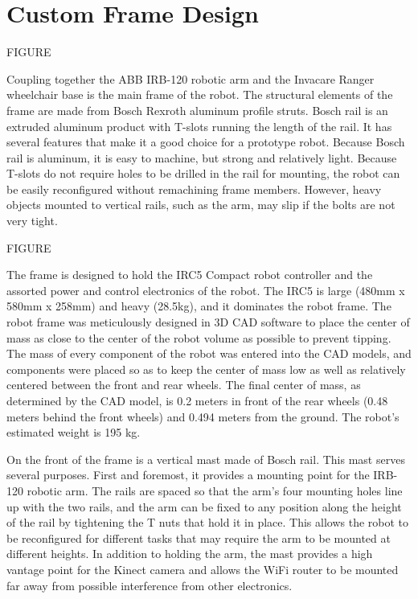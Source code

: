 \documentclass[]{cwru} %
\begin{document}
\chapter{Custom Frame Design}

FIGURE

Coupling together the ABB IRB-120 robotic arm and the Invacare Ranger
wheelchair base is the main frame of the robot. The structural elements
of the frame are made from Bosch Rexroth aluminum profile struts. Bosch
rail is an extruded aluminum product with T-slots running the length of
the rail. It has several features that make it a good choice for a
prototype robot. Because Bosch rail is aluminum, it is easy to machine,
but strong and relatively light. Because T-slots do not require holes to
be drilled in the rail for mounting, the robot can be easily
reconfigured without remachining frame members. However, heavy objects
mounted to vertical rails, such as the arm, may slip if the bolts are
not very tight.

FIGURE

The frame is designed to hold the IRC5 Compact robot controller and the
assorted power and control electronics of the robot. The IRC5 is large
(480mm x 580mm x 258mm) and heavy (28.5kg), and it dominates the robot
frame. The robot frame was meticulously designed in 3D CAD software to
place the center of mass as close to the center of the robot volume as
possible to prevent tipping. The mass of every component of the robot
was entered into the CAD models, and components were placed so as to
keep the center of mass low as well as relatively centered between the
front and rear wheels. The final center of mass, as determined by the
CAD model, is 0.2 meters in front of the rear wheels (0.48 meters behind
the front wheels) and 0.494 meters from the ground. The robot's
estimated weight is 195 kg.

On the front of the frame is a vertical mast made of Bosch rail. This
mast serves several purposes. First and foremost, it provides a mounting
point for the IRB-120 robotic arm. The rails are spaced so that the
arm's four mounting holes line up with the two rails, and the arm can be
fixed to any position along the height of the rail by tightening the T
nuts that hold it in place. This allows the robot to be reconfigured for
different tasks that may require the arm to be mounted at different
heights. In addition to holding the arm, the mast provides a high
vantage point for the Kinect camera and allows the WiFi router to be
mounted far away from possible interference from other electronics.
\end{document}
